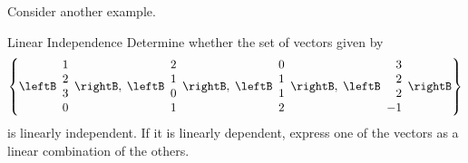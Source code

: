 Consider another example.

\begin{example}{Linear Independence}\label{exa:linearindependence}
Determine whether the set of vectors given by  
\[\left\{ 
\leftB
\begin{array}{r}
1 \\
2 \\
3 \\
0
\end{array}
\rightB, \; \leftB
\begin{array}{r}
2 \\
1 \\
0 \\
1
\end{array}
\rightB, \; \leftB
\begin{array}{r}
0 \\
1 \\
1 \\
2
\end{array}
\rightB, \; \leftB
\begin{array}{r}
3 \\
2 \\
2 \\
-1
\end{array}
\rightB \right\} \]
is linearly independent. If it is linearly dependent,
express one of the vectors as a linear combination of the others.
\end{example}

